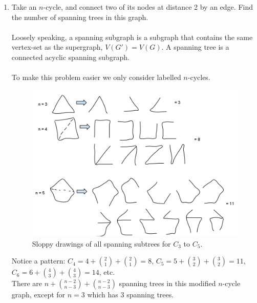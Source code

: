 \documentclass[10pt,a4paper,final]{article}
\begin{document}
\begin{enumerate}
\item %
Take an $n$-cycle, and connect two of its nodes at distance 2 by an edge.
Find the number of spanning trees in this graph. \\
\\
Loosely speaking, a spanning subgraph is a subgraph that contains the same vertex-set as the supergraph,
$V(G') = V(G)$. A spanning tree is a connected acyclic spanning subgraph. \\
\\
To make this problem easier we only consider labelled $n$-cycles.

\begin{figure}[h!]
  \centering
    \includegraphics[scale=0.4]{q6.png}
  \caption{Sloppy drawings of all spanning subtrees for $C_3$ to $C_5$.}
  \label{q6}
\end{figure}

Notice a pattern: $C_4 = 4 + \binom{2}{1} + \binom{2}{1} = 8$,
$C_5 = 5 + \binom{3}{2} + \binom{3}{2} = 11$, $C_6 = 6 + \binom{4}{3} + \binom{4}{3} = 14$, etc. \\
There are $n + \binom{n-2}{n-3} + \binom{n-2}{n-3}$ spanning trees in this
modified $n$-cycle graph, except for $n=3$ which has 3 spanning trees.

\end{enumerate}
\end{document}
